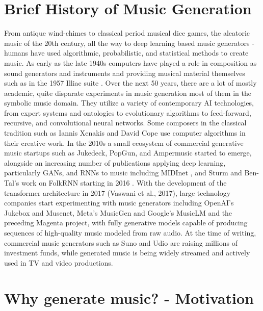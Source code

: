 \section{Brief History of Music Generation}
From antique wind-chimes to classical period musical dice games, the aleatoric music of the 20th century, all the way to deep learning based music generators -humans have used algorithmic, probabilistic, and statistical methods to create music. As early as the late 1940s computers have played a role in composition as sound generators and instruments \cite{France-Presse_2016} and providing musical material themselves such as in the 1957 Illiac suite \cite{Hiller_Isaacson_1959}. Over the next 50 years, there are a lot of mostly academic, quite disparate experiments in music generation most of them in the symbolic music domain. They utilize a variety of contemporary AI technologies, from expert systems and ontologies to evolutionary algorithms to feed-forward, recursive, and convolutional neural networks. Some composers in the classical tradition such as Iannis Xenakis \cite{Xenakis_1992} and David Cope \cite{Cope_1989} use computer algorithms in their creative work. 
In the 2010s a small ecosystem of commercial generative music startups such as Jukedeck, PopGun, and Ampermusic \cite{Featherstone_2017} started to emerge, alongside an increasing number of publications applying deep learning, particularly GANs, and RNNs to music including MIDInet \cite{midinet}, \cite{Hadjeres_Pachet_Nielsen_2017} and Sturm and Ben-Tal’s work on FolkRNN starting in 2016 \cite{Sturm_Ben-Tal_2016}. With the development of the transformer architecture in 2017 (Vaswani et al., 2017), large technology companies start experimenting with music generators including OpenAI’s Jukebox \cite{Dhariwal_Jun_Payne_Kim_Radford_Sutskever_2020} and Musenet\cite{Christine_2019}, Meta’s MusicGen\cite{copet2023simple} and Google’s MusicLM \cite{Agostinelli_Denk_Borsos_Engel_Verzetti_Caillon_Huang_Jansen_Roberts_Tagliasacchi_et_al._2023} and the preceding Magenta project, with fully generative models capable of producing sequences of high-quality music modeled from raw audio. At the time of writing, commercial music generators such as Suno and Udio are raising millions of investment funds\cite{Stassen_2024}, while generated music is being widely streamed and actively used in TV and video productions. 

\section{Why generate music? - Motivation}
